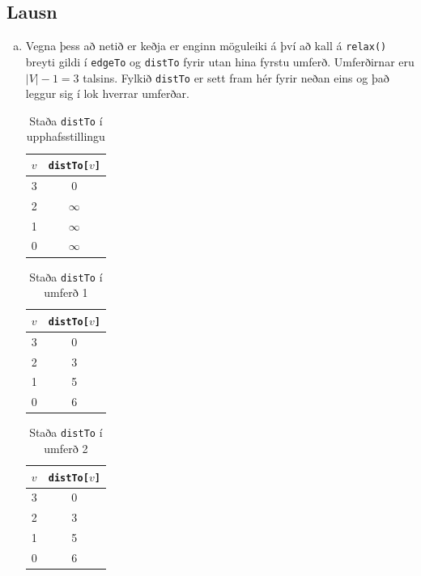 \documentclass[12pt, a4paper, hidelinks]{article}
\begin{document}
\subsection*{Lausn}
\begin{enumerate}[(a)]
    \item Vegna þess að netið er keðja er enginn möguleiki á því að kall á \texttt{relax()} breyti gildi í \texttt{edgeTo} og \texttt{distTo} fyrir utan hina fyrstu umferð. Umferðirnar eru $|V| - 1 = 3$ talsins. Fylkið \texttt{distTo} er sett fram hér fyrir neðan eins og það leggur sig í lok hverrar umferðar.

    \begin{table}[H]
        \centering
        \caption{Staða \texttt{distTo} í upphafsstillingu}
        \begin{tabular}{lc}
            \toprule
            $v$ & \texttt{distTo[$v$]} \\
            \midrule
            3   & 0        \\
            2   & $\infty$ \\
            1   & $\infty$ \\
            0   & $\infty$ \\
            \bottomrule
        \end{tabular}
        \label{tab:my_label}
    \end{table}
    
    \begin{table}[H]
        \centering
        \caption{Staða \texttt{distTo} í umferð 1}
        \begin{tabular}{lc}
            \toprule
            $v$ & \texttt{distTo[$v$]} \\
            \midrule
            3   & 0        \\
            2   & 3         \\
            1   & 5 \\
            0   & 6 \\
            \bottomrule
        \end{tabular}
        \label{tab:my_label}
    \end{table}
    
    \begin{table}[H]
        \centering
        \caption{Staða \texttt{distTo} í umferð 2}
        \begin{tabular}{lc}
            \toprule
            $v$ & \texttt{distTo[$v$]} \\
            \midrule
            3   & 0        \\
            2   & 3         \\
            1   & 5 \\
            0   & 6 \\
            \bottomrule
        \end{tabular}
        \label{tab:my_label}
    \end{table}
    

\end{enumerate}
\end{document}
